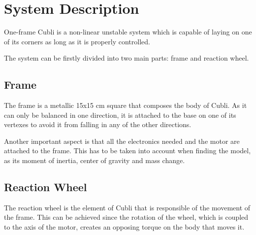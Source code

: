 \chapter{System Description}
One-frame Cubli is a non-linear unstable system which is capable of laying on one of its corners as long as it is properly controlled.

The system can be firstly divided into two main parts: frame and reaction wheel.

\section{Frame}
The frame is a metallic 15x15 cm square that composes the body of Cubli. As it can only be balanced in one direction, it is attached to the base on one of its vertexes to avoid it from falling in any of the other directions.

Another important aspect is that all the electronics needed and the motor are attached to the frame. This has to be taken into account when finding the model, as its  moment of inertia, center of gravity and mass change.

\section{Reaction Wheel}
The reaction wheel is the element of Cubli that is responsible of the movement of the frame. This can be achieved since the rotation of the wheel, which is coupled to the axis of the motor, creates an opposing torque on the body that moves it.